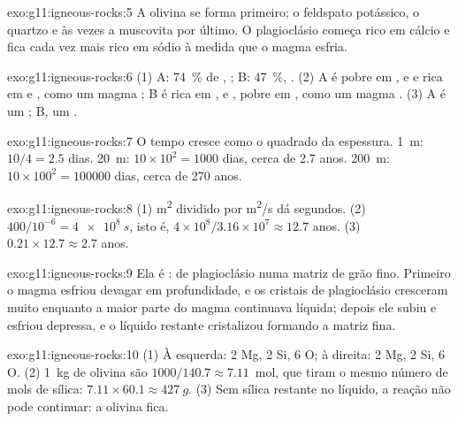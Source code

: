 \begin{solution}{exo:g11:igneous-rocks:5}
A olivina se forma primeiro; o feldspato potássico, o quartzo e às vezes a
muscovita por último. O plagioclásio começa rico em cálcio e fica cada vez
mais rico em sódio à medida que o magma esfria.
\end{solution}

\begin{solution}{exo:g11:igneous-rocks:6}
(1) A: \qty{74}{\percent} de , ; B: \qty{47}{\percent},
. (2) A é pobre em ,  e  e rica em  e
, como um magma ; B é rica em ,  e ,
pobre em , como um magma . (3) A é um ; B, um .
\end{solution}

\begin{solution}{exo:g11:igneous-rocks:7}
O tempo cresce como o quadrado da espessura. \qty{1}{m}: $10/4 = 2.5$
dias. \qty{20}{m}: $10 \times 10^2 = 1000$ dias, cerca de 2.7 anos.
\qty{200}{m}: $10 \times 100^2 = \num{100000}$ dias, cerca de 270 anos.
\end{solution}

\begin{solution}{exo:g11:igneous-rocks:8}
(1) \unit{m^2} dividido por \unit{m^2/s} dá segundos. (2) $400/10^{-6} =
\qty{4e8}{s}$, isto é, $4 \times 10^8 / 3.16 \times 10^7 \approx 12.7$
anos. (3) $0.21 \times 12.7 \approx 2.7$ anos.
\end{solution}

\begin{solution}{exo:g11:igneous-rocks:9}
Ela é :  de plagioclásio numa matriz de grão fino.
Primeiro o magma esfriou devagar em profundidade, e os cristais de
plagioclásio cresceram muito enquanto a maior parte do magma continuava
líquida; depois ele subiu e esfriou depressa, e o líquido restante
cristalizou formando a matriz fina.
\end{solution}

\begin{solution}{exo:g11:igneous-rocks:10}
(1) À esquerda: 2 Mg, 2 Si, 6 O; à direita: 2 Mg, 2 Si, 6 O. (2) \qty{1}{kg}
de olivina são $1000/140.7 \approx 7.11$~mol, que tiram o mesmo número de
mols de sílica: $7.11 \times 60.1 \approx \qty{427}{g}$. (3) Sem sílica
restante no líquido, a reação não pode continuar: a olivina fica.
\end{solution}

